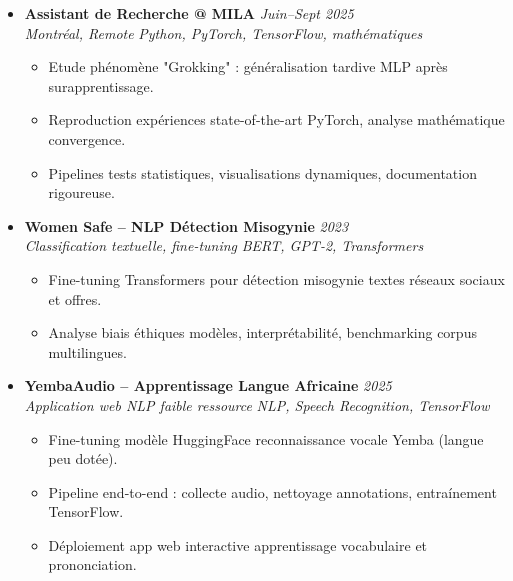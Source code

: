 \documentclass[a4paper,11pt]{article}
\begin{document}
\begin{itemize}[leftmargin=0.5cm, nosep]
    \item \textbf{Assistant de Recherche @ MILA} \hfill \textit{Juin--Sept 2025} \\
    \textit{Montr\'eal, Remote} \hfill \textit{Python, PyTorch, TensorFlow, math\'ematiques}
    \vspace{-2pt}
    \begin{itemize}[leftmargin=0.4cm, nosep, label=\tiny$\bullet$]
        \item \small{Etude ph\'enom\`ene "Grokking" : g\'en\'eralisation tardive MLP apr\`es surapprentissage.}
        \item \small{Reproduction exp\'eriences state-of-the-art PyTorch, analyse math\'ematique convergence.}
        \item \small{Pipelines tests statistiques, visualisations dynamiques, documentation rigoureuse.}
    \end{itemize}
    \vspace{3pt}

    \item \textbf{Women Safe -- NLP D\'etection Misogynie} \hfill \textit{2023} \\
    \textit{Classification textuelle, fine-tuning} \hfill \textit{BERT, GPT-2, Transformers}
    \vspace{-2pt}
    \begin{itemize}[leftmargin=0.4cm, nosep, label=\tiny$\bullet$]
        \item \small{Fine-tuning Transformers pour d\'etection misogynie textes r\'eseaux sociaux et offres.}
        \item \small{Analyse biais \'ethiques mod\`eles, interpr\'etabilit\'e, benchmarking corpus multilingues.}
    \end{itemize}
    \vspace{3pt}

    \item \textbf{YembaAudio -- Apprentissage Langue Africaine} \hfill \textit{2025} \\
    \textit{Application web NLP faible ressource} \hfill \textit{NLP, Speech Recognition, TensorFlow}
    \vspace{-2pt}
    \begin{itemize}[leftmargin=0.4cm, nosep, label=\tiny$\bullet$]
        \item \small{Fine-tuning mod\`ele HuggingFace reconnaissance vocale Yemba (langue peu dot\'ee).}
        \item \small{Pipeline end-to-end : collecte audio, nettoyage annotations, entra\'inement TensorFlow.}
        \item \small{D\'eploiement app web interactive apprentissage vocabulaire et prononciation.}
    \end{itemize}
    \vspace{3pt}


\end{itemize}
\end{document}
